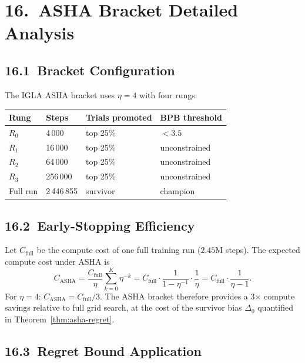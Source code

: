 \section{16.\ ASHA Bracket Detailed Analysis}
\label{sec:ch26-asha-bracket-detail}

\subsection{16.1\ Bracket Configuration}

The IGLA ASHA bracket uses \(\eta = 4\) with four rungs:

\begin{longtable}[]{@{}llll@{}}
\toprule\noalign{}
Rung & Steps & Trials promoted & BPB threshold \\
\midrule\noalign{}
\endhead
\bottomrule\noalign{}
\endlastfoot
\(R_0\) & 4\,000 & top 25\% & \(<3.5\) \\
\(R_1\) & 16\,000 & top 25\% & unconstrained \\
\(R_2\) & 64\,000 & top 25\% & unconstrained \\
\(R_3\) & 256\,000 & top 25\% & unconstrained \\
Full run & 2\,446\,855 & survivor & champion \\
\end{longtable}

\subsection{16.2\ Early-Stopping Efficiency}

Let \(C_{\text{full}}\) be the compute cost of one full training run
(\(2.45\mathrm{M}\) steps).  The expected compute cost under ASHA is
\[
  C_{\text{ASHA}} = \frac{C_{\text{full}}}{\eta} \sum_{k=0}^{K} \eta^{-k}
    = C_{\text{full}} \cdot \frac{1}{1 - \eta^{-1}} \cdot \frac{1}{\eta}
    = C_{\text{full}} \cdot \frac{1}{\eta - 1}.
\]
For \(\eta = 4\): \(C_{\text{ASHA}} = C_{\text{full}} / 3\).
The ASHA bracket therefore provides a 3× compute savings relative to
full grid search, at the cost of the survivor bias \(\Delta_0\) quantified
in Theorem~\ref{thm:asha-regret}.

\subsection{16.3\ Regret Bound Application}

